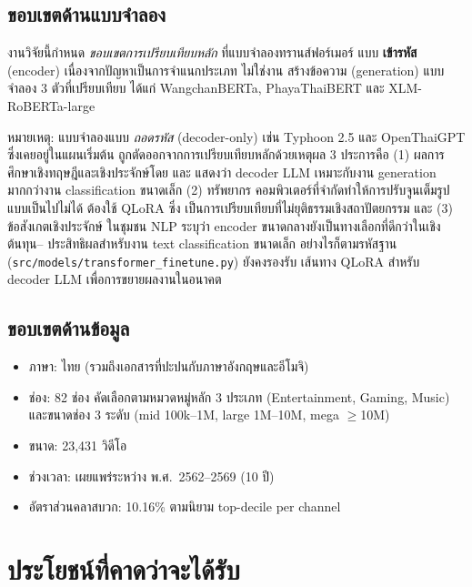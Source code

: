 \subsection{ขอบเขตด้านแบบจำลอง}

งานวิจัยนี้กำหนด \emph{ขอบเขตการเปรียบเทียบหลัก} ที่แบบจำลองทรานส์ฟอร์เมอร์
แบบ \textbf{เข้ารหัส} (encoder) เนื่องจากปัญหาเป็นการจำแนกประเภท ไม่ใช่งาน
สร้างข้อความ (generation) แบบจำลอง 3 ตัวที่เปรียบเทียบ ได้แก่
WangchanBERTa, PhayaThaiBERT และ XLM-RoBERTa-large

หมายเหตุ: แบบจำลองแบบ \emph{ถอดรหัส} (decoder-only) เช่น Typhoon 2.5 และ
OpenThaiGPT ซึ่งเคยอยู่ในแผนเริ่มต้น ถูกตัดออกจากการเปรียบเทียบหลักด้วยเหตุผล
3 ประการคือ (1) ผลการศึกษาเชิงทฤษฎีและเชิงประจักษ์โดย \textcite{touvron2023llama} และ \textcite{wei2022emergent} แสดงว่า decoder
LLM เหมาะกับงาน generation มากกว่างาน classification ขนาดเล็ก (2) ทรัพยากร
คอมพิวเตอร์ที่จำกัดทำให้การปรับจูนเต็มรูปแบบเป็นไปไม่ได้ ต้องใช้ QLoRA ซึ่ง
เป็นการเปรียบเทียบที่ไม่ยุติธรรมเชิงสถาปัตยกรรม และ (3) ข้อสังเกตเชิงประจักษ์
ในชุมชน NLP ระบุว่า encoder ขนาดกลางยังเป็นทางเลือกที่ดีกว่าในเชิงต้นทุน--
ประสิทธิผลสำหรับงาน text classification ขนาดเล็ก
อย่างไรก็ตามรหัสฐาน (\texttt{src/models/transformer\_finetune.py}) ยังคงรองรับ
เส้นทาง QLoRA สำหรับ decoder LLM เพื่อการขยายผลงานในอนาคต

\subsection{ขอบเขตด้านข้อมูล}
\begin{itemize}[leftmargin=2em]
  \item ภาษา: ไทย (รวมถึงเอกสารที่ปะปนกับภาษาอังกฤษและอีโมจิ)
  \item ช่อง: 82 ช่อง คัดเลือกตามหมวดหมู่หลัก 3 ประเภท (Entertainment, Gaming,
        Music) และขนาดช่อง 3 ระดับ (mid 100k--1M, large 1M--10M, mega $\geq$10M)
  \item ขนาด: 23{,}431 วิดีโอ
  \item ช่วงเวลา: เผยแพร่ระหว่าง พ.ศ.\ 2562--2569 (10 ปี)
  \item อัตราส่วนคลาสบวก: 10.16\% ตามนิยาม top-decile per channel
\end{itemize}

\section{ประโยชน์ที่คาดว่าจะได้รับ}
\label{sec:intro-benefits}

